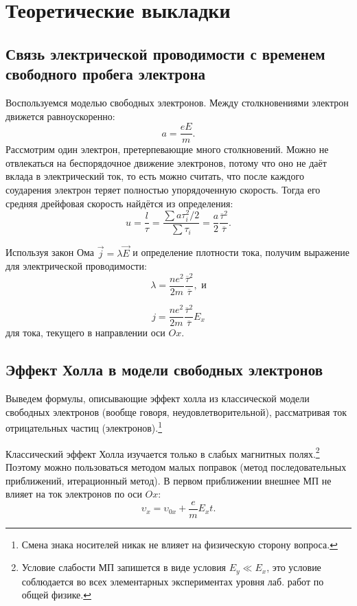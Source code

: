 \documentclass[a4paper, 12pt]{article}
\begin{document}


\section*{Теоретические выкладки}
\subsection*{Связь электрической проводимости с временем свободного пробега электрона}
{
Воспользуемся моделью свободных электронов. Между столкновениями электрон движется равноускоренно:
$$ a = \frac{eE}{m}.$$
Рассмотрим один электрон, претерпевающие много столкновений. Можно не отвлекаться на беспорядочное движение электронов, потому что оно не даёт вклада в электрический ток, то есть можно считать, что после каждого соударения электрон теряет полностью упорядоченную скорость. Тогда его средняя дрейфовая скорость найдётся из определения:
$$u = \frac{l}{\tau}=\frac{\sum a\tau_i^2/2}{\sum \tau_i}=\frac{a}{2}\frac{\overline \tau^2}{\overline \tau}.$$

Используя закон Ома $ \vec j = \lambda \vec E$ и определение плотности тока, получим выражение для электрической проводимости:
$$\lambda = \frac{ne^2}{2m}\frac{\overline \tau^2}{\overline \tau}, \text{ и}$$

\begin{equation}\label{lambda}
j= \frac{ne^2}{2m}\frac{\overline \tau^2}{\overline \tau} E_x
\end{equation}
для тока, текущего в направлении оси $Ox$.




\subsection*{Эффект Холла в модели свободных электронов}

Выведем формулы, описывающие эффект холла из классической модели свободных электронов (вообще говоря, неудовлетворительной), рассматривая ток отрицательных частиц (электронов).\footnote{Смена знака носителей никак не влияет на физическую сторону вопроса.}

Классический эффект Холла изучается только в слабых магнитных полях.\footnote{Условие слабости МП запишется в виде условия $E_y \ll E_x$, это условие соблюдается во всех элементарных экспериментах уровня лаб. работ по общей физике.} Поэтому можно пользоваться методом малых поправок (метод последовательных приближений, итерационный метод). В первом приближении внешнее МП не влияет на ток электронов по оси $Ox$:
$$\upsilon_x=\upsilon_{0x}+\frac{e}{m}E_xt.$$

}
\end{document}
